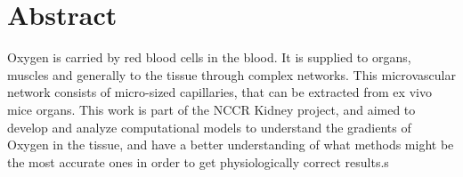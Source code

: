 \section*{Abstract}

Oxygen is carried by red blood cells in the blood. It is supplied to organs, muscles and generally to the tissue through complex networks. This microvascular network consists of micro-sized capillaries, that can be extracted from ex vivo mice organs. This work is part of the NCCR Kidney project, and aimed to develop and analyze computational models to understand the gradients of Oxygen in the tissue, and have a better understanding of what methods might be the most accurate ones in order to get physiologically correct results.s